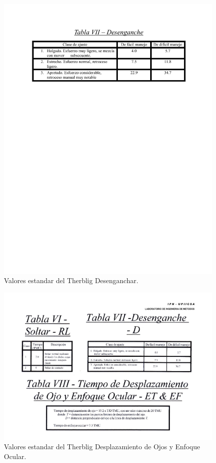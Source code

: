 \begin{figure}[H]
    \centering
    \includegraphics[scale=0.5]{15/img/tabla7Desenganche.pdf}
    \caption{Valores estandar del Therblig Desenganchar.}
    \label{fig:tabla7Desenganche}
\end{figure}

\begin{figure}[H]
    \centering
    \includegraphics[scale=0.35]{15/img/tabla8TiempoDesplazamientoOjo.pdf}
    \caption{Valores estandar del Therblig Desplazamiento de Ojos y Enfoque Ocular.}
    \label{fig:tabla8TiemposDezplazamientoOjo}
\end{figure}

